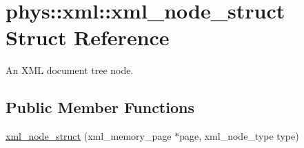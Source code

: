 \hypertarget{structphys_1_1xml_1_1xml__node__struct}{
\section{phys::xml::xml\_\-node\_\-struct Struct Reference}
\label{da/d96/structphys_1_1xml_1_1xml__node__struct}
}


An XML document tree node.  


\subsection*{Public Member Functions}
\begin{DoxyCompactItemize}
\item 
\hyperlink{structphys_1_1xml_1_1xml__node__struct_a998317bc20875241aa0d0b1e1020a379}{xml\_\-node\_\-struct} (xml\_\-memory\_\-page $\ast$page, xml\_\-node\_\-type type)
\end{DoxyCompactItemize}
